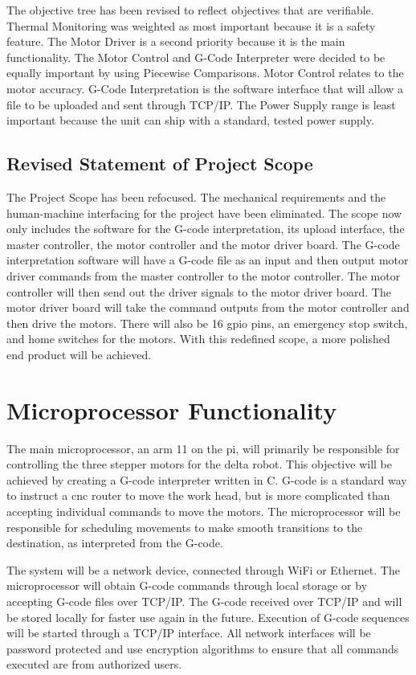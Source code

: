 The objective tree has been revised to reflect objectives that are verifiable.
Thermal Monitoring was weighted as most important because it is a safety feature.
The Motor Driver is a second priority because it is the main functionality.
The Motor Control and G-Code Interpreter were decided to be equally important by using Piecewise Comparisons.
Motor Control relates to the motor accuracy.
G-Code Interpretation is the software interface that will allow a file to be uploaded and sent through TCP/IP.
The Power Supply range is least important because the unit can ship with a standard, tested power supply. 
\subsection{Revised Statement of Project Scope}
The Project Scope has been refocused. 
The mechanical requirements and the human-machine interfacing for the project have been eliminated.
The scope now only includes the software for the G-code interpretation, its upload interface, the master controller, the motor controller and the motor driver board.
The G-code interpretation software will have a G-code file as an input and then output motor driver commands from the master controller to the motor controller.
The motor controller will then send out the driver signals to the motor driver board. 
The motor driver board will take the command outputs from the motor controller and then drive the motors. 
There will also be 16 \gls{gpio} pins, an emergency stop switch, and home switches for the motors. 
With this redefined scope, a more polished end product will be achieved. 
\section{Microprocessor Functionality}
The main microprocessor, an \gls{arm} 11 on the \gls{pi}, will primarily be responsible for controlling the three stepper motors for the delta robot.
This objective will be achieved by creating a G-code interpreter written in C.
G-code is a standard way to instruct a \gls{cnc} router to move the work head, but is more complicated than accepting individual commands to move the motors.
The microprocessor will be responsible for scheduling movements to make smooth transitions to the destination, as interpreted from the G-code.

The system will be a network device, connected through WiFi or Ethernet.
The microprocessor will obtain G-code commands through local storage or by accepting G-code files over TCP/IP.
The G-code received over TCP/IP and will be stored locally for faster use again in the future.
Execution of G-code sequences will be started through a TCP/IP interface.
All network interfaces will be password protected and use encryption algorithms to ensure that all commands executed are from authorized users. 

